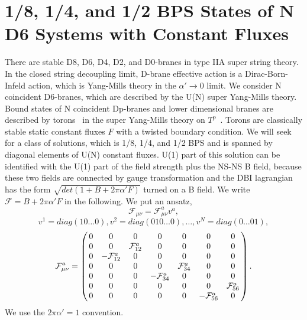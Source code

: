\documentclass[a4paper,12pt]{article}
\begin{document}
\section{1/8, 1/4, and 1/2 BPS States of N D6 Systems with Constant Fluxes}
There are stable D8, D6, D4, D2, and D0-branes in type IIA super string theory. In the closed string decoupling limit, D-brane effective action is a Dirac-Born-Infeld action, which is Yang-Mills theory in the $ \alpha ' \to 0 $ limit. We consider N coincident D6-branes, which are described by the U(N) super Yang-Mills theory. Bound states of N coincident Dp-branes and lower dimensional branes are described by torons~\cite{thooft} in the super Yang-Mills theory on $T^p$~\cite{taylor, toron}. Torons are classically stable static constant fluxes $F$ with a twisted boundary condition. We will seek for a class of solutions, which is 1/8, 1/4, and 1/2 BPS and is spanned by diagonal elements of U(N) constant fluxes. U(1) part of this solution can be identified with the U(1) part of the field strength plus the NS-NS B field, because these two fields are connected by gauge transformation and the DBI lagrangian has the form $ \sqrt{det(1+B+2\pi\alpha'F)}$ turned on a B field. We write $\mathcal{F}=B+2\pi\alpha'F$ in the following.
We put an ansatz,
\[\mathcal{F}_{\mu\nu}=\mathcal{F}_{\mu\nu}^av^a, \]
\[v^1=diag(10 \ldots 0), v^2=diag(010\ldots0), \ldots, v^N=diag(0\ldots01),\]
\begin{equation}
\mathcal{F}_{\mu\nu}^a=\left(
\begin{array}{@{\,}ccccccc@{\,}}
 0 & 0 & 0 & 0 & 0 & 0 & 0 \\ 
 0 & 0 & \mathcal{F}_{12}^a & 0 & 0 & 0 & 0 \\
 0 & -\mathcal{F}_{12}^a & 0 & 0 & 0 & 0 & 0 \\
 0 & 0 & 0 & 0 & \mathcal{F}_{34}^a & 0 & 0 \\
 0 & 0 & 0 & -\mathcal{F}_{34}^a & 0 & 0 & 0 \\
 0 & 0 & 0 & 0 & 0 & 0 & \mathcal{F}_{56}^a \\
 0 & 0 & 0 & 0 & 0 & -\mathcal{F}_{56}^a & 0 
\end{array}
\right). \label{eq:ansatz}
\end{equation}   
We use the $ 2\pi \alpha' = 1$ convention.
\end{document}

